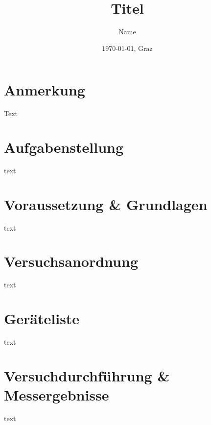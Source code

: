 \documentclass[11pt]{scrartcl}
\date{\today{}, Graz}
\author{Name}
\title{Titel}
\begin{document}
    \tableofcontents
    \newpage

    \section*{Anmerkung}
    \label{sec:anmerkung}
    Text

    \section{Aufgabenstellung}
    \label{sec:Aufgabenstellung}
    text
    
    
    \section{Voraussetzung \& Grundlagen}
    \label{sec:voraussetzungen-grundlagen}
    text 


    \section{Versuchsanordnung}
    \label{sec:versuchsandordnung}
    text

    \section{Geräteliste}
    \label{sec:geraeteliste}
    text

    \section{Versuchdurchführung \& Messergebnisse}
    \label{sec:versuchdurchfuehrung-messergebnisse}
    text

\end{document}
